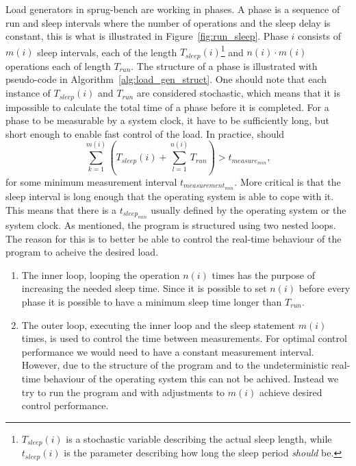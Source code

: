 \documentclass{article}
\begin{document}
Load generators in sprug-bench are working in phases. A phase is a
sequence of run and sleep intervals where the number of operations and
the sleep delay is constant, this is what is illustrated in
Figure~\ref{fig:run_sleep}. Phase $i$ consists of $m(i)$ sleep
intervals, each of the length $T_{sleep}(i)$\footnote{$T_{sleep}(i)$
  is a stochastic variable describing the actual sleep length, while
  $t_{sleep}(i)$ is the parameter describing how long the sleep period
  \emph{should} be.} and $n(i)\cdot m(i)$ operations each of length
$T_{run}$. The structure of a phase is illustrated with pseudo-code in
Algorithm~\ref{alg:load_gen_struct}. One should note that each
instance of $T_{sleep}(i)$ and $T_{run}$ are considered stochastic,
which means that it is impossible to calculate the total time of a
phase before it is completed. For a phase to be measurable by a system
clock, it have to be sufficiently long, but short enough to enable
fast control of the load. In practice,
should 
\begin{equation}
\label{eq:t_measure_min}
\sum_{k=1}^{m(i)}\left( T_{sleep}(i) + \sum_{l=1}^{n(i)}T_{run}
\right) > t_{measure_{min}},
\end{equation}
for some minimum measurement interval $t_{measurement_{min}}$. More
critical is that the sleep interval is long enough that the operating
system is able to cope with it.  This means that there is a
$t_{sleep_{min}}$ usually defined by the operating system or the
system clock. As mentioned, the program is structured using two nested
loops. The reason for this is to better be able to control the
real-time behaviour of the program to acheive the desired load.
\begin{enumerate}[]
\item The inner loop, looping the operation $n(i)$ times has the
  purpose of increasing the needed sleep time. Since it is possible to
  set $n(i)$ before every phase it is possible to have a minimum sleep
  time longer than $T_{run}$.
\item The outer loop, executing the inner loop and the sleep statement
  $m(i)$ times, is used to control the time between measurements. For
  optimal control performance we would need to have a constant
  measurement interval. However, due to the structure of the program
  and to the undeterministic real-time behaviour of the operating
  system this can not be achived. Instead we try to run the program
  and with adjustments to $m(i)$ achieve desired control performance.
\end{enumerate}
\end{document}
